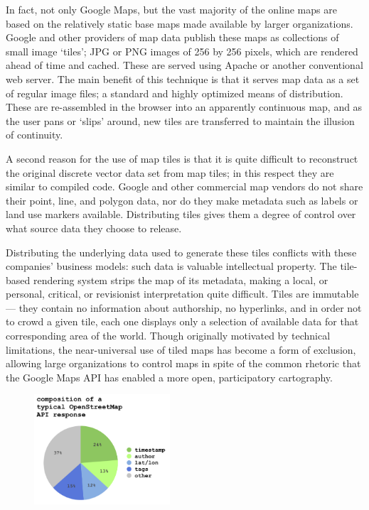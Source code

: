 \documentclass[11pt,oneside,notitlepage]{report}
\begin{document}
{{In fact, not only Google Maps, but the vast majority of the online maps are based on the relatively static base maps made available by larger organizations. Google and other providers of map data publish these maps as collections of small image `tiles'; JPG or PNG images of 256 by 256 pixels, which are rendered ahead of time and cached. These are served using Apache or another conventional web server. The main benefit of this technique is that it serves map data as a set of regular image files; a standard and highly optimized means of distribution. These are re-assembled in the browser into an apparently continuous map, and as the user pans or `slips' around, new tiles are transferred to maintain the illusion of continuity.

A second reason for the use of map tiles is that it is quite difficult to reconstruct the original discrete vector data set from map tiles; in this respect they are similar to compiled code. Google and other commercial map vendors do not share their point, line, and polygon data, nor do they make metadata such as labels or land use markers available. Distributing tiles gives them a degree of control over what source data they choose to release.

Distributing the underlying data used to generate these tiles conflicts with these companies' business models: such data is valuable intellectual property. The tile-based rendering system strips the map of its metadata, making a local, or personal, critical, or revisionist interpretation quite difficult. Tiles are immutable --- they contain no information about authorship, no hyperlinks, and in order not to crowd a given tile, each one displays only a selection of available data for that corresponding area of the world. Though originally motivated by technical limitations, the near-universal use of tiled maps has become a form of exclusion, allowing large organizations to control maps in spite of the common rhetoric that the Google Maps API has enabled a more open, participatory cartography. 

\begin{figure}
	\begin{flushleft}
		\includegraphics[width=0.45\textwidth]{images/osm-composition.png}
	\end{flushleft}
\end{figure}

}}
\end{document}
